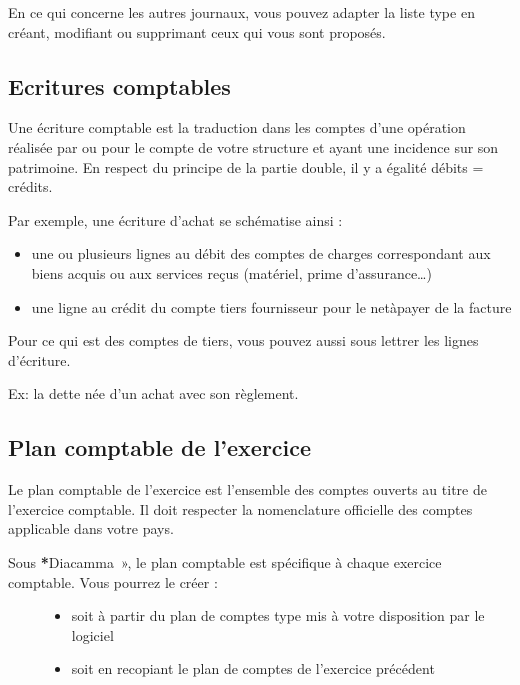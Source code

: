 \documentclass[a4paper,10pt,oneside,french]{sphinxmanual}
\begin{document}
\sphinxAtStartPar
En ce qui concerne les autres journaux, vous pouvez adapter la liste type en créant, modifiant ou supprimant ceux qui vous sont proposés.


\subsection{Ecritures comptables}
\label{\detokenize{accounting/definition:ecritures-comptables}}
\sphinxAtStartPar
Une écriture comptable est la traduction dans les comptes d’une opération réalisée par ou pour le compte de votre structure et ayant une incidence sur son patrimoine. En respect du principe de la partie double, il y a égalité débits = crédits.

\sphinxAtStartPar
Par exemple, une écriture d’achat se schématise ainsi :
\begin{itemize}
\item {} 
\sphinxAtStartPar
une ou plusieurs lignes au débit des comptes de charges correspondant aux biens acquis ou aux services reçus (matériel, prime d’assurance…)

\item {} 
\sphinxAtStartPar
une ligne au crédit du compte tiers fournisseur pour le net\sphinxhyphen{}à\sphinxhyphen{}payer de la facture

\end{itemize}

\sphinxAtStartPar
Pour ce qui est des comptes de tiers, vous pouvez aussi sous  lettrer les lignes d’écriture.

\sphinxAtStartPar
Ex: la dette née d’un achat avec son règlement.


\subsection{Plan comptable de l’exercice}
\label{\detokenize{accounting/definition:plan-comptable-de-l-exercice}}
\sphinxAtStartPar
Le plan comptable de l’exercice est l’ensemble des comptes ouverts au titre de l’exercice comptable. Il doit respecter  la nomenclature officielle des comptes applicable dans votre pays.
\begin{description}
\item[{Sous {\color{red}\bfseries{}*}Diacamma », le plan comptable est spécifique à chaque exercice comptable. Vous pourrez le créer :}] \leavevmode\begin{itemize}
\item {} 
\sphinxAtStartPar
soit  à partir du plan de comptes type mis à votre disposition par le logiciel

\item {} 
\sphinxAtStartPar
soit en recopiant le plan de comptes de l’exercice précédent

\end{itemize}

\end{description}
\end{document}
